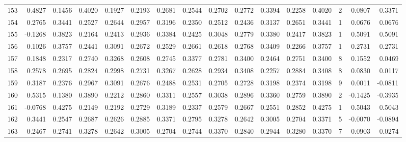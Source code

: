 \begin{tabular}{lrrrrrrrrrrrrrrr}
153 &      0.4827 &  0.1456 &  0.4020 &  0.1927 &  0.2193 &  0.2681 &  0.2544 &  0.2702 &  0.2772 &  0.3394 &   0.2258 &     0.4020 &      2 &                   -0.0807 &                    -0.3371 \\
154 &      0.2765 &  0.3441 &  0.2527 &  0.2644 &  0.2957 &  0.3196 &  0.2350 &  0.2512 &  0.2436 &  0.3137 &   0.2651 &     0.3441 &      1 &                    0.0676 &                     0.0676 \\
155 &     -0.1268 &  0.3823 &  0.2164 &  0.2413 &  0.2936 &  0.3384 &  0.2425 &  0.3048 &  0.2779 &  0.3380 &   0.2417 &     0.3823 &      1 &                    0.5091 &                     0.5091 \\
156 &      0.1026 &  0.3757 &  0.2441 &  0.3091 &  0.2672 &  0.2529 &  0.2661 &  0.2618 &  0.2768 &  0.3409 &   0.2266 &     0.3757 &      1 &                    0.2731 &                     0.2731 \\
157 &      0.1848 &  0.2317 &  0.2740 &  0.3268 &  0.2608 &  0.2745 &  0.3377 &  0.2781 &  0.3400 &  0.2464 &   0.2751 &     0.3400 &      8 &                    0.1552 &                     0.0469 \\
158 &      0.2578 &  0.2695 &  0.2824 &  0.2998 &  0.2731 &  0.3267 &  0.2628 &  0.2934 &  0.3408 &  0.2257 &   0.2884 &     0.3408 &      8 &                    0.0830 &                     0.0117 \\
159 &      0.3187 &  0.2376 &  0.2967 &  0.3091 &  0.2676 &  0.2488 &  0.2531 &  0.2705 &  0.2728 &  0.3198 &   0.2374 &     0.3198 &      9 &                    0.0011 &                    -0.0811 \\
160 &      0.5315 &  0.1380 &  0.3890 &  0.2212 &  0.2860 &  0.3311 &  0.2557 &  0.3038 &  0.2896 &  0.3360 &   0.2759 &     0.3890 &      2 &                   -0.1425 &                    -0.3935 \\
161 &     -0.0768 &  0.4275 &  0.2149 &  0.2192 &  0.2729 &  0.3189 &  0.2337 &  0.2579 &  0.2667 &  0.2551 &   0.2852 &     0.4275 &      1 &                    0.5043 &                     0.5043 \\
162 &      0.3441 &  0.2547 &  0.2687 &  0.2626 &  0.2885 &  0.3371 &  0.2795 &  0.3278 &  0.2642 &  0.3005 &   0.2704 &     0.3371 &      5 &                   -0.0070 &                    -0.0894 \\
163 &      0.2467 &  0.2741 &  0.3278 &  0.2642 &  0.3005 &  0.2704 &  0.2744 &  0.3370 &  0.2840 &  0.2944 &   0.3280 &     0.3370 &      7 &                    0.0903 &                     0.0274 \\

\end{tabular}
